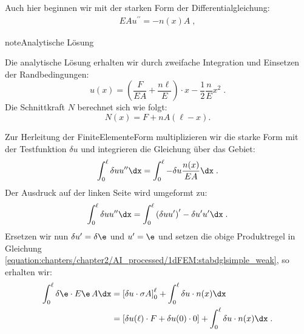 \documentclass[letterpaper,10pt,german]{jupyterBook}
\begin{document}
\sphinxAtStartPar
Auch hier beginnen wir mit der starken Form der Differentialgleichung:
\begin{equation}\label{equation:chapters/chapter2/1dFEM:stabdglsimple_2}
\begin{split} {EA} u^{\prime \prime} =  - {n(x)} A \; ,\end{split}
\end{equation}
\begin{sphinxadmonition}{note}{Analytische Lösung}

\sphinxAtStartPar
Die analytische Lösung erhalten wir durch zweifache Integration und Einsetzen der Randbedingungen:
\label{equation:chapters/chapter2/1dFEM:f2f743eb-071b-42f3-b9e0-bda207f97822}\begin{equation}
u(x) = \left( \frac{F}{EA} + \frac{n \ell}{E}\right)\cdot x - \frac{1}{2} \frac{n}{E} x^2 \; . 
\end{equation}
\sphinxAtStartPar
Die Schnittkraft \(N\) berechnet sich wie folgt:
\label{equation:chapters/chapter2/1dFEM:12ec9b66-02a2-48a8-8f4b-8f5204a87061}\begin{equation}
N(x) = F + n A (\ell-x). 
\end{equation}\end{sphinxadmonition}

\sphinxAtStartPar
Zur Herleitung der Finite\sphinxhyphen{}Elemente\sphinxhyphen{}Form multiplizieren wir die starke Form mit der Testfunktion \(\delta u\) und integrieren die Gleichung über das Gebiet:
\begin{equation}\label{equation:chapters/chapter2/1dFEM:stabdglsimple_weak}
\begin{split} \int_{0}^{\ell} \delta u u^{\prime \prime} \dx = \int_{0}^{\ell} - \delta u \frac{n(x)}{EA} \dx\; .\end{split}
\end{equation}
\sphinxAtStartPar
Der Ausdruck auf der linken Seite wird umgeformt zu:
\begin{equation}\label{equation:chapters/chapter2/1dFEM:stabdglsimple_product}
\begin{split} \int_{0}^{\ell} \delta u u^{\prime \prime} \dx = \int_{0}^{\ell} \left(\delta u u^{\prime}\right)^{\prime} - \delta u^{\prime}  u^{\prime}  \dx\; .\end{split}
\end{equation}
\sphinxAtStartPar
Ersetzen wir nun \(\delta u^{\prime}=\delta \e\) und \(u^{\prime}=\e\) und setzen die obige Produktregel in Gleichung \eqref{equation:chapters/chapter2/AI_processed/1dFEM:stabdglsimple_weak}, so erhalten wir:
\begin{equation}\label{equation:chapters/chapter2/1dFEM:stabdglsimple_weak2}
\begin{split}\begin{align}
 \int_{0}^{\ell} \delta \e \cdot E\e \, A \dx & = \left[\delta u \cdot \sigma A \right]_0^{\ell} + \int_0^{\ell} \delta u \cdot n(x) \dx\;  \\
 & = \left[ \delta u(\ell) \cdot F + \delta u(0) \cdot 0\right]+ \int_0^{\ell} \delta u \cdot n(x) \dx\; .
 \end{align}\end{split}
\end{equation}
\end{document}
